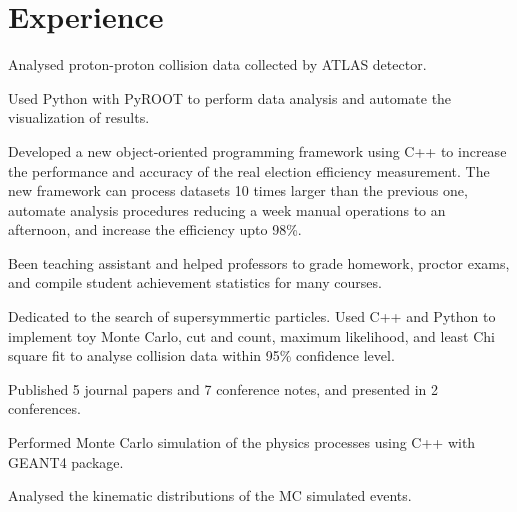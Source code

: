 \documentclass[letterpaper]{deedy-resume-openfont}
\begin{document}

\section{Experience}

\begin{tightemize}
\item Analysed proton-proton collision data collected by ATLAS detector.
\item Used Python with PyROOT to perform data analysis and automate the visualization of results.
\item Developed a new object-oriented programming framework using C++ to increase the performance and accuracy of the real election efficiency measurement. The new framework can process datasets 10 times larger than the previous one, automate analysis procedures reducing a week manual operations to an afternoon, and increase the efficiency upto 98\%.
\end{tightemize}
\sectionsep

\begin{tightemize}
\item Been teaching assistant and helped professors to grade homework, proctor exams, and compile student achievement statistics for many courses.
\item Dedicated to the search of supersymmertic particles. Used C++ and Python to implement toy Monte Carlo, cut and count, maximum likelihood, and least Chi square fit to analyse collision data within 95\% confidence level.
\item Published 5 journal papers and 7 conference notes, and presented in 2 conferences.
\end{tightemize}
\sectionsep

\begin{tightemize}
\item Performed Monte Carlo simulation of the physics processes using C++ with GEANT4 package.
\item Analysed the kinematic distributions of the MC simulated events.
\end{tightemize}
\sectionsep
\end{document}
